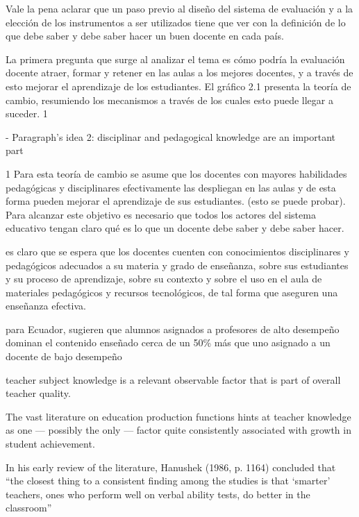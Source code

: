 Vale la pena aclarar que un paso previo al diseño del sistema de evaluación y a la elección de los instrumentos a ser utilizados tiene que ver con la definición de lo que debe saber y debe saber hacer un buen docente en cada país.

La primera pregunta que surge al analizar el tema es cómo podría la evaluación docente atraer, formar y retener en las aulas a los mejores docentes, y a través de esto mejorar el aprendizaje de los estudiantes. El gráfico 2.1 presenta la teoría de cambio, resumiendo los
mecanismos a través de los cuales esto puede llegar a suceder. 1 \citep{Hincapie_et_al_2020}





- Paragraph's idea 2: disciplinar and pedagogical knowledge are an important part

1 Para esta teoría de cambio se asume que los docentes con mayores habilidades pedagógicas y disciplinares efectivamente las despliegan en las aulas y de esta forma pueden mejorar el aprendizaje de sus estudiantes. (esto se puede probar). Para alcanzar este objetivo es necesario que todos los actores del sistema educativo tengan claro qué es lo que un docente debe saber y debe saber hacer. \citep{Hincapie_et_al_2020}


es claro que se espera que los docentes cuenten con conocimientos disciplinares y pedagógicos adecuados a su materia y grado de enseñanza, sobre sus estudiantes y su proceso de aprendizaje, sobre su contexto y sobre el uso en el aula de materiales pedagógicos y recursos tecnológicos, de tal forma que aseguren una enseñanza efectiva. \citep{Hincapie_et_al_2020}


\citep{Araujo_et_al_2016} para Ecuador, sugieren que alumnos asignados a profesores de alto desempeño dominan el contenido enseñado cerca de un 50\% más que uno asignado a un docente de bajo desempeño


teacher subject knowledge is a relevant observable factor that is part of overall teacher
quality. \citep{Metzler_et_al_2012}


The vast literature on education production functions hints at teacher knowledge as one — possibly the only — factor quite consistently associated with growth in student achievement. \citep{Metzler_et_al_2012}


In his early review of the literature, Hanushek (1986, p. 1164) concluded that “the closest thing to a consistent finding among the studies is that ‘smarter’ teachers, ones who perform well on verbal ability tests, do better in the classroom”


